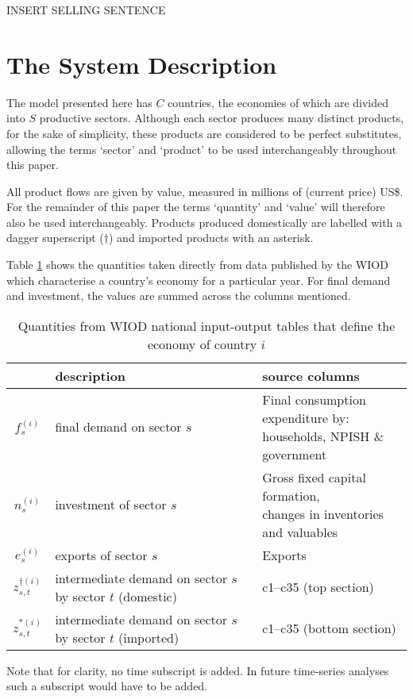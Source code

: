 \documentclass[a4paper]{article}
\begin{document}
INSERT SELLING SENTENCE

\section{The System Description} \label{sec:system}
The model presented here has $C$ countries, the economies of which are divided into $S$ productive sectors.
Although each sector produces many distinct products, for the sake of simplicity, these products are considered to be perfect substitutes, allowing the terms `sector' and `product' to be used interchangeably throughout this paper.

All product flows are given by value, measured in millions of (current price) US\$.
For the remainder of this paper the terms `quantity' and `value' will therefore also be used interchangeably.
Products produced domestically are labelled with a dagger superscript ($\dagger$) and imported products with an asterisk.

Table \ref{tbl:cvars} shows the quantities taken directly from data published by the WIOD which characterise a country's economy for a particular year. For final demand and investment, the values are summed across the columns mentioned.
\begin{table}
\begin{center}
\begin{tabular}{cp{5cm}l}
\toprule
	            & description                 & source columns \\ \midrule
	$f_s^{(i)}$ & final demand on sector $s$  & 
		\parbox[t]{6cm}{Final consumption expenditure by: \\ households, NPISH \& government} \\
	$n_s^{(i)}$ & investment of sector $s$    & 
		\parbox[t]{6cm}{Gross fixed capital formation, \\
						changes in inventories and valuables}\\
	$e_s^{(i)}$ & exports of sector $s$       & Exports \\
	$z_{s,t}^{\dagger(i)}$ & intermediate demand on 
							sector $s$ by sector $t$ (domestic)& c1--c35 (top section)\\
	$z_{s,t}^{*(i)}$ & intermediate demand on 
							sector $s$ by sector $t$ (imported)& c1--c35 (bottom section)
\\\bottomrule
\end{tabular}
\end{center}
\caption{Quantities from WIOD national input-output tables that define the economy of country $i$}\label{tbl:cvars}
\end{table}
Note that for clarity, no time subscript is added. In future time-series analyses such a subscript would have to be added.
\end{document}
